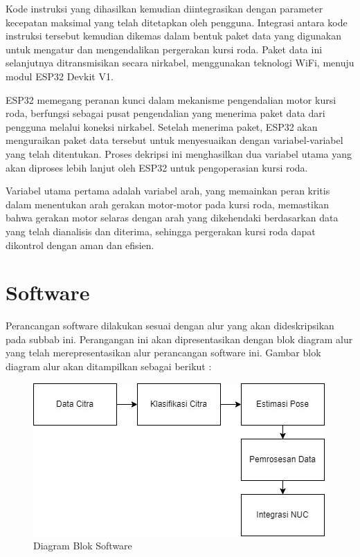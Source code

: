 Kode instruksi yang dihasilkan kemudian diintegrasikan dengan parameter kecepatan maksimal yang telah ditetapkan oleh pengguna. Integrasi antara kode instruksi tersebut kemudian dikemas dalam bentuk paket data yang digunakan untuk mengatur dan mengendalikan pergerakan kursi roda. Paket data ini selanjutnya ditransmisikan secara nirkabel, menggunakan teknologi WiFi, menuju modul ESP32 Devkit V1.

ESP32 memegang peranan kunci dalam mekanisme pengendalian motor kursi roda, berfungsi sebagai pusat pengendalian yang menerima paket data dari pengguna melalui koneksi nirkabel. Setelah menerima paket, ESP32 akan menguraikan paket data tersebut untuk menyesuaikan dengan variabel-variabel yang telah ditentukan. Proses dekripsi ini menghasilkan dua variabel utama yang akan diproses lebih lanjut oleh ESP32 untuk pengoperasian kursi roda.

Variabel utama pertama adalah variabel arah, yang memainkan peran kritis dalam menentukan arah gerakan motor-motor pada kursi roda, memastikan bahwa gerakan motor selaras dengan arah yang dikehendaki berdasarkan data yang telah dianalisis dan diterima, sehingga pergerakan kursi roda dapat dikontrol dengan aman dan efisien.\parencite{ekatama2024perancangan}


\section{Software}
Perancangan software dilakukan sesuai dengan alur yang akan dideskripsikan pada subbab ini. Perangangan ini akan dipresentasikan dengan blok diagram alur yang telah merepresentasikan alur perancangan software ini. Gambar blok diagram alur akan ditampilkan sebagai berikut :

\begin{figure}[H]
    \centering
    \includegraphics[scale = 0.6]{gambar/DIagram p.jpg}
    \caption{Diagram Blok Software}
    \label{fig:enter-label}
\end{figure}

